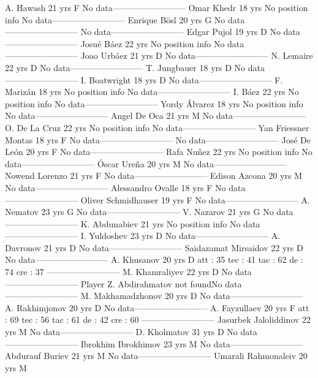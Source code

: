 A. Hawash  21 yrs 
F 
No data--------------------------
Omar Khedr  18 yrs 
No position info 
No data--------------------------
Enrique Bösl  20 yrs 
G 
No data--------------------------
No data--------------------------
Edgar Pujol  19 yrs 
D 
No data--------------------------
Josué Báez  22 yrs 
No position info 
No data--------------------------
Joao Urbáez  21 yrs 
D 
No data--------------------------
N. Lemaire  22 yrs 
D 
No data--------------------------
T. Jungbauer  18 yrs 
D 
No data--------------------------
I. Boatwright  18 yrs 
D 
No data--------------------------
F. Marizán  18 yrs 
No position info 
No data--------------------------
I. Báez  22 yrs 
No position info 
No data--------------------------
Yordy Álvarez  18 yrs 
No position info 
No data--------------------------
Angel De Oca  21 yrs 
M 
No data--------------------------
O. De La Cruz  22 yrs 
No position info 
No data--------------------------
Yan Friessner Montas  18 yrs 
F 
No data--------------------------
No data--------------------------
José De León  20 yrs 
F 
No data--------------------------
Rafa Nuñez  22 yrs 
No position info 
No data--------------------------
Óscar Ureña  20 yrs 
M 
No data--------------------------
Nowend Lorenzo  21 yrs 
F 
No data--------------------------
Edison Azcona  20 yrs 
M 
No data--------------------------
Alessandro Ovalle  18 yrs 
F 
No data--------------------------
Oliver Schmidhauser  19 yrs 
F 
No data--------------------------
A. Nematov  23 yrs 
G 
No data--------------------------
V. Nazarov  21 yrs 
G 
No data--------------------------
K. Abdunabiev  21 yrs 
No position info 
No data--------------------------
I. Yuldoshev  23 yrs 
D 
No data--------------------------
A. Davronov  21 yrs 
D 
No data--------------------------
Saidazamat Mirsaidov  22 yrs 
D 
No data--------------------------
A. Khusanov  20 yrs 
D 
 att : 35 
 tec : 41 
 tac : 62 
 de : 74 
 cre : 37 
--------------------------
M. Khamraliyev  22 yrs 
D 
No data--------------------------
Player Z. Abdirahmatov not foundNo data--------------------------
M. Makhamadzhonov  20 yrs 
D 
No data--------------------------
A. Rakhimjonov  20 yrs 
D 
No data--------------------------
A. Fayzullaev  20 yrs 
F 
 att : 69 
 tec : 56 
 tac : 61 
 de : 42 
 cre : 60 
--------------------------
Jasurbek Jaloliddinov  22 yrs 
M 
No data--------------------------
D. Kholmatov  31 yrs 
D 
No data--------------------------
Ibrokhim Ibrokhimov  23 yrs 
M 
No data--------------------------
Abdurauf Buriev  21 yrs 
M 
No data--------------------------
Umarali Rahmonaleiv  20 yrs 
M 
